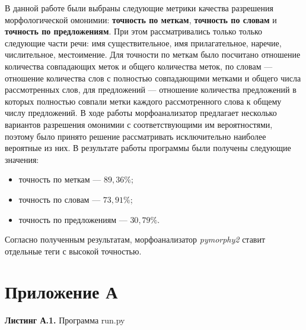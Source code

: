 \documentclass[14pt,a4paper]{extarticle}
\begin{document}
		В данной работе были выбраны следующие метрики качества разрешения морфологической омонимии: \textbf{точность по меткам}, \textbf{точность по словам} и \textbf{точность по предложениям}. При этом рассматривались только только следующие части речи: имя существительное, имя прилагательное, наречие, числительное, местоимение. Для точности по меткам было посчитано отношение количества совпадающих меток и общего количества меток, по словам --- отношение количества слов с полностью совпадающими метками и общего числа рассмотренных слов, для предложений --- отношение количества предложений в которых полностью совпали метки каждого рассмотренного слова к общему числу предложений. В ходе работы морфоанализатор предлагает несколько вариантов разрешения омонимии с соответствующими им вероятностями, поэтому было принято решение рассматривать исключительно наиболее вероятные из них. 
		\newpage
		В результате работы программы были получены следующие значения:
		\begin{itemize}
			\item точность по меткам --- $89,36\%$;
			\item точность по словам --- $73,91\%$;
			\item точность по предложениям --- $30,79\%$.
		\end{itemize}
		
	\begin{results}
		Согласно полученным результатам, морфоанализатор \textit{pymorphy2} ставит отдельные теги с высокой точностью.
	\end{results}

	\section*{Приложение А}
	
	\centering\textbf{Листинг А.1.} Программа run.py
	
\end{document}
